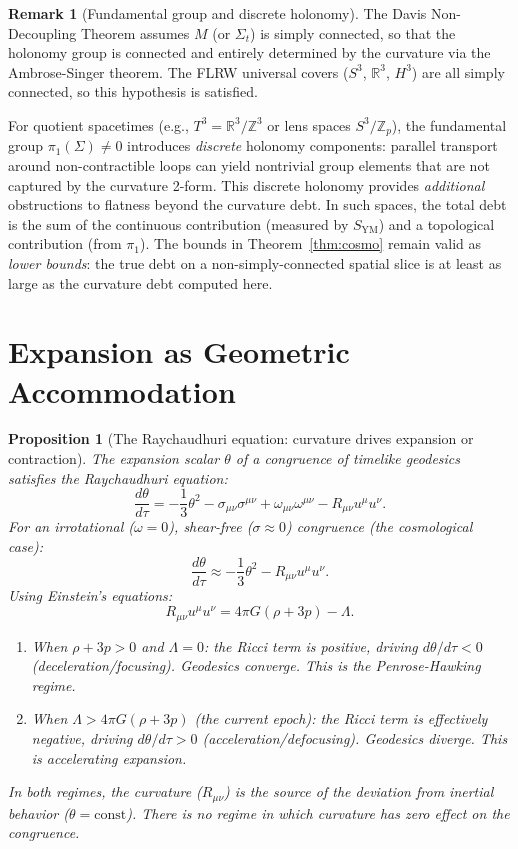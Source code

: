 \documentclass[12pt]{amsart}
\newtheorem{proposition}[theorem]{Proposition}
\theoremstyle{definition}
\newtheorem{remark}[theorem]{Remark}
\newcommand{\R}{\mathbb{R}}
\newcommand{\SYM}{S_{\mathrm{YM}}}
\begin{document}
\begin{remark}[Fundamental group and discrete holonomy]
\label{rmk:pi1}
The Davis Non-Decoupling Theorem \cite{davis2026} assumes $M$ (or $\Sigma_t$) is simply connected, so that the holonomy group is connected and entirely determined by the curvature via the Ambrose-Singer theorem.  The FLRW universal covers ($S^3$, $\R^3$, $H^3$) are all simply connected, so this hypothesis is satisfied.

For quotient spacetimes (e.g., $T^3 = \R^3/\mathbb{Z}^3$ or lens spaces $S^3/\mathbb{Z}_p$), the fundamental group $\pi_1(\Sigma) \neq 0$ introduces \emph{discrete} holonomy components: parallel transport around non-contractible loops can yield nontrivial group elements that are not captured by the curvature 2-form.  This discrete holonomy provides \emph{additional} obstructions to flatness beyond the curvature debt.  In such spaces, the total debt is the sum of the continuous contribution (measured by $\SYM$) and a topological contribution (from $\pi_1$).  The bounds in Theorem~\ref{thm:cosmo} remain valid as \emph{lower bounds}: the true debt on a non-simply-connected spatial slice is at least as large as the curvature debt computed here.
\end{remark}


\section{Expansion as Geometric Accommodation}

\begin{proposition}[The Raychaudhuri equation: curvature drives expansion or contraction]
\label{prop:raychaudhuri}
The expansion scalar $\theta$ of a congruence of timelike geodesics satisfies the Raychaudhuri equation:
\[
\frac{d\theta}{d\tau} = -\frac{1}{3}\theta^2 - \sigma_{\mu\nu}\sigma^{\mu\nu} + \omega_{\mu\nu}\omega^{\mu\nu} - R_{\mu\nu}u^\mu u^\nu.
\]
For an irrotational ($\omega = 0$), shear-free ($\sigma \approx 0$) congruence (the cosmological case):
\[
\frac{d\theta}{d\tau} \approx -\frac{1}{3}\theta^2 - R_{\mu\nu}u^\mu u^\nu.
\]
Using Einstein's equations:
\[
R_{\mu\nu}u^\mu u^\nu = 4\pi G(\rho + 3p) - \Lambda.
\]
\begin{enumerate}[label=\textup{(\alph*)}]
\item When $\rho + 3p > 0$ and $\Lambda = 0$: the Ricci term is positive, driving $d\theta/d\tau < 0$ (deceleration/focusing).  Geodesics converge.  This is the Penrose-Hawking regime.
\item When $\Lambda > 4\pi G(\rho + 3p)$ (the current epoch): the Ricci term is effectively negative, driving $d\theta/d\tau > 0$ (acceleration/defocusing).  Geodesics diverge.  This is accelerating expansion.
\end{enumerate}
In both regimes, the curvature ($R_{\mu\nu}$) is the source of the deviation from inertial behavior ($\theta = \text{const}$).  There is no regime in which curvature has zero effect on the congruence.
\end{proposition}
\end{document}
